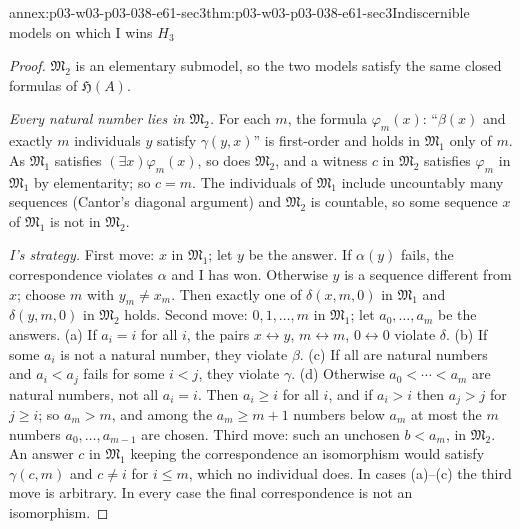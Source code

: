 \begin{annexitem}{annex:p03-w03-p03-038-e61-sec3}{thm:p03-w03-p03-038-e61-sec3}{Indiscernible models on which I wins \(H_3\)}
\begin{proof}
\(\mathfrak M_2\) is an elementary submodel, so the two models satisfy the
same closed formulas of \(\mathfrak H(A)\).

\emph{Every natural number lies in \(\mathfrak M_2\).} For each \(m\), the
formula \(\varphi_m(x)\): ``\(\beta(x)\) and exactly \(m\) individuals \(y\)
satisfy \(\gamma(y,x)\)'' is first-order and holds in \(\mathfrak M_1\)
only of \(m\). As \(\mathfrak M_1\) satisfies \((\exists x)\varphi_m(x)\),
so does \(\mathfrak M_2\), and a witness \(c\) in \(\mathfrak M_2\)
satisfies \(\varphi_m\) in \(\mathfrak M_1\) by elementarity; so \(c=m\).
The individuals of \(\mathfrak M_1\) include uncountably many sequences
(Cantor's diagonal argument) and \(\mathfrak M_2\) is countable, so some
sequence \(x\) of \(\mathfrak M_1\) is not in \(\mathfrak M_2\).

\emph{I's strategy.} First move: \(x\) in \(\mathfrak M_1\); let \(y\) be
the answer. If \(\alpha(y)\) fails, the correspondence violates \(\alpha\)
and I has won. Otherwise \(y\) is a sequence different from \(x\); choose
\(m\) with \(y_m\ne x_m\). Then exactly one of \(\delta(x,m,0)\) in
\(\mathfrak M_1\) and \(\delta(y,m,0)\) in \(\mathfrak M_2\) holds. Second
move: \(0,1,\ldots,m\) in \(\mathfrak M_1\); let \(a_0,\ldots,a_m\) be the
answers. (a) If \(a_i=i\) for all \(i\), the pairs \(x\leftrightarrow y\),
\(m\leftrightarrow m\), \(0\leftrightarrow0\) violate \(\delta\).
(b) If some \(a_i\) is not a natural number, they violate \(\beta\).
(c) If all are natural numbers and \(a_i<a_j\) fails for some \(i<j\),
they violate \(\gamma\). (d) Otherwise \(a_0<\cdots<a_m\) are natural
numbers, not all \(a_i=i\). Then \(a_i\ge i\) for all \(i\), and if
\(a_i>i\) then \(a_j>j\) for \(j\ge i\); so \(a_m>m\), and among the
\(a_m\ge m+1\) numbers below \(a_m\) at most the \(m\) numbers
\(a_0,\ldots,a_{m-1}\) are chosen. Third move: such an unchosen \(b<a_m\),
in \(\mathfrak M_2\). An answer \(c\) in \(\mathfrak M_1\) keeping the
correspondence an isomorphism would satisfy \(\gamma(c,m)\) and \(c\ne i\)
for \(i\le m\), which no individual does. In cases (a)--(c) the third move
is arbitrary. In every case the final correspondence is not an isomorphism.
\end{proof}
\end{annexitem}

